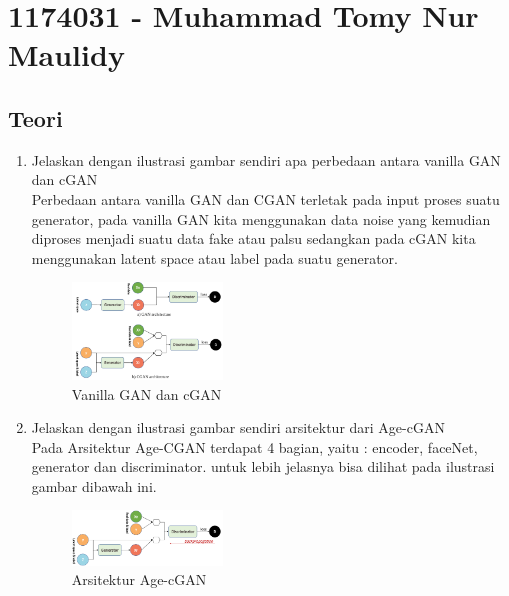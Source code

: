 \section{1174031 - Muhammad Tomy Nur Maulidy}

\subsection{Teori}
\begin{enumerate}
\item Jelaskan dengan ilustrasi gambar sendiri apa perbedaan antara vanilla GAN dan cGAN\\
Perbedaan antara vanilla GAN dan CGAN terletak pada input proses suatu generator, pada vanilla GAN kita menggunakan data noise yang kemudian diproses menjadi suatu data fake atau palsu sedangkan pada cGAN kita menggunakan latent space atau label pada suatu generator. 
\begin{figure}[H]
	\includegraphics[width=4cm]{figures/1174031/9/1.png}
	\centering
	\caption{Vanilla GAN dan cGAN}
\end{figure}

\item Jelaskan dengan ilustrasi gambar sendiri arsitektur dari Age-cGAN\\
Pada Arsitektur Age-CGAN terdapat 4 bagian, yaitu : encoder, faceNet, generator dan discriminator.
untuk lebih jelasnya bisa dilihat pada ilustrasi gambar dibawah ini.
\begin{figure}[H]
	\includegraphics[width=4cm]{figures/1174031/9/2.png}
	\centering
	\caption{Arsitektur Age-cGAN}
\end{figure}


\end{enumerate}
